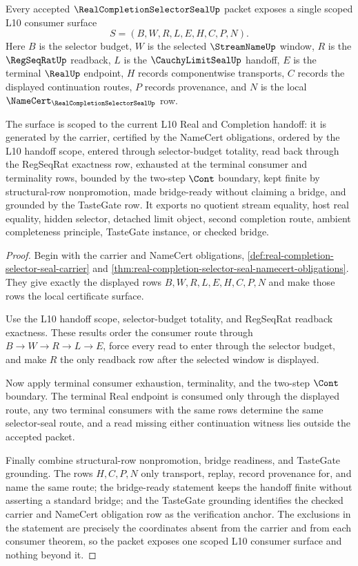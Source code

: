 \begin{theorem}
\label{thm:real-completion-selector-seal-scoped-consumer-surface}
Every accepted $\RealCompletionSelectorSealUp$ packet exposes a single scoped L10 consumer surface
$$
S=(B,W,R,L,E,H,C,P,N).
$$
Here $B$ is the selector budget, $W$ is the selected $\StreamNameUp$ window, $R$ is the $\RegSeqRatUp$ readback, $L$ is the $\CauchyLimitSealUp$ handoff, $E$ is the terminal $\RealUp$ endpoint, $H$ records componentwise transports, $C$ records the displayed continuation routes, $P$ records provenance, and $N$ is the local $\NameCert_{\RealCompletionSelectorSealUp}$ row.

The surface is scoped to the current L10 Real and Completion handoff: it is generated by the carrier, certified by the NameCert obligations, ordered by the L10 handoff scope, entered through selector-budget totality, read back through the RegSeqRat exactness row, exhausted at the terminal consumer and terminality rows, bounded by the two-step $\Cont$ boundary, kept finite by structural-row nonpromotion, made bridge-ready without claiming a bridge, and grounded by the TasteGate row. It exports no quotient stream equality, host real equality, hidden selector, detached limit object, second completion route, ambient completeness principle, TasteGate instance, or checked bridge.
\end{theorem}
\begin{proof}
Begin with the carrier and NameCert obligations, \autoref{def:real-completion-selector-seal-carrier} and \autoref{thm:real-completion-selector-seal-namecert-obligations}. They give exactly the displayed rows $B,W,R,L,E,H,C,P,N$ and make those rows the local certificate surface.

Use the L10 handoff scope, selector-budget totality, and RegSeqRat readback exactness. These results order the consumer route through $B \to W \to R \to L \to E$, force every read to enter through the selector budget, and make $R$ the only readback row after the selected window is displayed.

Now apply terminal consumer exhaustion, terminality, and the two-step $\Cont$ boundary. The terminal Real endpoint is consumed only through the displayed route, any two terminal consumers with the same rows determine the same selector-seal route, and a read missing either continuation witness lies outside the accepted packet.

Finally combine structural-row nonpromotion, bridge readiness, and TasteGate grounding. The rows $H,C,P,N$ only transport, replay, record provenance for, and name the same route; the bridge-ready statement keeps the handoff finite without asserting a standard bridge; and the TasteGate grounding identifies the checked carrier and NameCert obligation row as the verification anchor. The exclusions in the statement are precisely the coordinates absent from the carrier and from each consumer theorem, so the packet exposes one scoped L10 consumer surface and nothing beyond it.
\end{proof}

